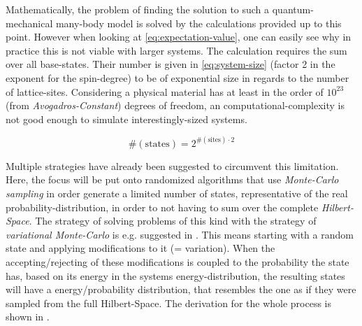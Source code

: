 Mathematically, the problem of finding the solution to such a quantum-mechanical many-body model is solved by the calculations provided up to this point. 
However when looking at \autoref{eq:expectation-value}, one can easily see why in practice this is not viable with larger systems. 
The calculation requires the sum over all base-states. 
Their number is given in \autoref{eq:system-size} (factor 2 in the exponent for the spin-degree) to be of exponential size in regards to the number of lattice-sites.
Considering a physical material has at least in the order of $10^{23}$ (from \emph{Avogadros-Constant}) degrees of freedom, an  computational-complexity is not good enough to simulate interestingly-sized systems. 

\begin{equation}
    \label{eq:system-size}
    \text{\#}(\text{states}) = 2^{\text{\#}(\text{sites}) \cdot 2}
\end{equation}

Multiple strategies have already been suggested to circumvent this limitation.
Here, the focus will be put onto randomized algorithms that use \emph{Monte-Carlo sampling} in order generate a limited number of states, representative of the real probability-distribution, in order to not having to sum over the complete \emph{Hilbert-Space}.
The strategy of solving problems of this kind with the strategy of \emph{variational Monte-Carlo} is e.g. suggested in \cite{metropolisAlgorithmAndVariationalMonteCarlo}.
This means starting with a random state and applying modifications to it (= variation).
When the accepting/rejecting of these modifications is coupled to the probability the state has, based on its energy in the systems energy-distribution, the resulting states will have a energy/probability distribution, that resembles the one as if they were sampled from the full Hilbert-Space.
The derivation for the whole process is shown in \cite{monteCarloObservableSampling}.

